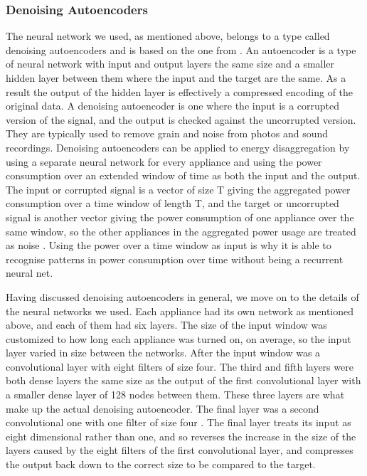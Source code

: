\documentclass{article}
\begin{document}
\subsubsection{Denoising Autoencoders}

The neural network we used, as mentioned above, belongs to a type called denoising autoencoders and is based on the one from \cite{Kelly}. An autoencoder is a type of neural network with input and output layers the same size and a smaller hidden layer between them where the input and the target are the same. As a result the output of the hidden layer is effectively a compressed encoding of the original data. A denoising autoencoder is one where the input is a corrupted version of the signal, and the output is checked against the uncorrupted version. They are typically used to remove grain and noise from photos and sound recordings. 
Denoising autoencoders can be applied to energy disaggregation by using a separate neural network for every appliance and using the power consumption over an extended window of time as both the input and the output. The input or corrupted signal is a vector of size T giving the aggregated power consumption over a time window of length T, and the target or uncorrupted signal is another vector giving the power consumption of one appliance over the same window, so the other appliances in the aggregated power usage are treated as noise \cite{Kelly}. Using the power over a time window as input is why it is able to recognise patterns in power consumption over time without being a recurrent neural net.

Having discussed denoising autoencoders in general, we move on to the details of the neural networks we used. Each appliance had its own network as mentioned above, and each of them had six layers. The size of the input window was customized to how long each appliance was turned on, on average, so the input layer varied in size between the networks. After the input window was a convolutional layer with eight filters of size four. The third and fifth layers were both dense layers the same size as the output of the first convolutional layer with a smaller dense layer of 128 nodes between them. These three layers are what make up the actual denoising autoencoder. The final layer was a second convolutional one with one filter of size four \cite{Kelly}. The final layer treats its input as eight dimensional rather than one, and so reverses the increase in the size of the layers caused by the eight filters of the first convolutional layer, and compresses the output back down to the correct size to be compared to the target.
\end{document}
